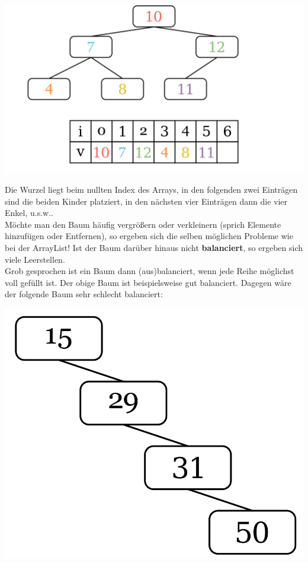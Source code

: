 \documentclass{article}
\begin{document}
\begin{center}
    \includegraphics[scale=0.15]{../../media/einbettung.png}
\end{center}
Die Wurzel liegt beim nullten Index des Arrays, in den folgenden zwei Einträgen sind die beiden Kinder platziert, in den nächsten vier Einträgen dann die vier Enkel, u.s.w.. \\
Möchte man den Baum häufig vergrößern oder verkleinern (sprich Elemente hinzufügen oder Entfernen), so ergeben sich die selben möglichen Probleme wie bei der ArrayList! Ist der Baum darüber hinaus nicht \textbf{balanciert}, so ergeben sich viele Leerstellen. \\
Grob gesprochen ist ein Baum dann (aus)balanciert, wenn jede Reihe möglichst voll gefüllt ist. Der obige Baum ist beispielsweise gut balanciert. Dagegen wäre der folgende Baum sehr schlecht balanciert: 
\begin{center}
    \includegraphics[scale=0.15]{../../media/linear.png}
\end{center}
\vspace{1mm}
\end{document}

